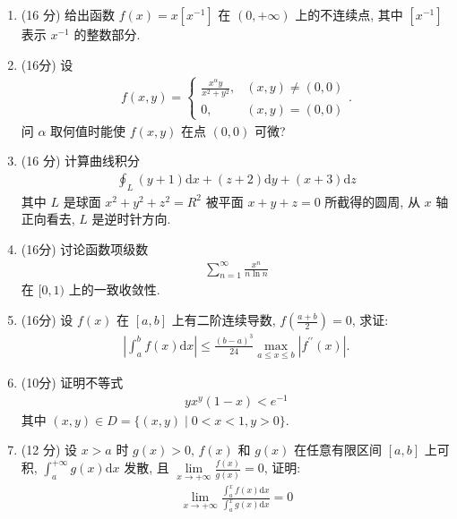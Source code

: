 \documentclass[space]{ctexart} %
\def\leq{\leqslant}
\begin{document}
\begin{enumerate}[itemsep=1.2em,label=\arabic*.,topsep=0pt,left=0em]
\begin{enumerate}[itemsep=1.2em,label=(\arabic*),topsep=0pt,left=2em]
\end{enumerate}

\item (16 分)  给出函数 $ f(x)=x\left[x^{-1}\right] $ 在 $ (0,+\infty) $ 上的不连续点, 其中 $ \left[x^{-1}\right] $ 表示 $ x^{-1} $ 的整数部分.

\item  (16分) 设
\begin{align*}
f(x, y)=\begin{cases}
    \frac{x^{\alpha} y}{x^{2}+y^{2}}, & (x, y) \neq(0,0) \\
0, & (x, y)=(0,0)
\end{cases}.
\end{align*}
问  $\alpha $ 取何值时能使 $ f(x, y) $ 在点 $ (0,0) $ 可微?

\item (16 分)  计算曲线积分
\begin{align*}
\oint_{L}(y+1) \mathrm{d} x+(z+2) \mathrm{d} y+(x+3) \mathrm{d} z
\end{align*}
其中 $ L $ 是球面 $ x^{2}+y^{2}+z^{2}=R^{2}$  被平面 $ x+y+z=0 $ 所截得的圆周, 从 $ x $ 轴正向看去, $ L$ 是逆时针方向.

\item  (16分)  讨论函数项级数
\begin{align*}
\sum_{n=1}^{\infty} \frac{x^{n}}{n \ln n}
\end{align*}
在  $[0,1) $ 上的一致收敛性.

\item  (16分)  设  $f(x)$  在  $[a, b] $ 上有二阶连续导数, $ f\left(\frac{a+b}{2}\right)=0 $, 求证:
\begin{align*}
\left|\int_{a}^{b} f(x) \mathrm{d} x\right| \leq \frac{(b-a)^{3}}{24} \max _{a \leq x \leq b}\left|f^{\prime \prime}(x)\right| .
\end{align*}

\item   (10分) 证明不等式
\begin{align*}
y x^{y}(1-x)<e^{-1}
\end{align*}
其中 $ (x, y) \in D=\{(x, y) \mid 0<x<1, y>0\} $.

\item  (12 分) 设 $ x>a $ 时 $ g(x)>0$, $f(x) $ 和 $ g(x) $ 在任意有限区间 $ [a, b] $ 上可积, $ \int_{a}^{+\infty} g(x) \mathrm{d} x $ 发散, 且 $ \lim\limits_{x \rightarrow+\infty} \frac{f(x)}{g(x)}=
0$, 证明:
\begin{align*}
\lim\limits_{x \rightarrow+\infty} \frac{\int_{a}^{x} f(x) \mathrm{d} x}{\int_{a}^{x} g(x) \mathrm{d} x}=0
\end{align*}


\end{enumerate}
\end{document}

